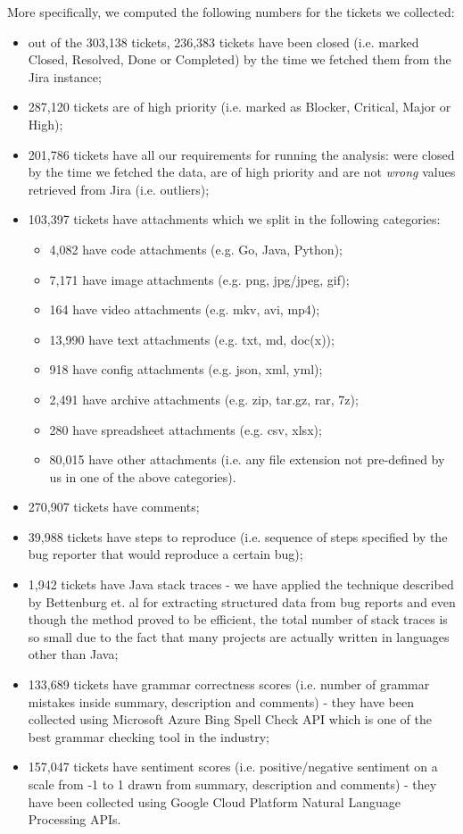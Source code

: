 \documentclass{mpaper}
\begin{document}
More specifically, we computed the following numbers for the tickets we collected:
\begin{itemize}
  \item out of the 303,138 tickets, 236,383 tickets have been closed (i.e. marked Closed, Resolved, Done or Completed) by the time we 
  fetched them from the Jira instance;
  \item 287,120 tickets are of high priority (i.e. marked as Blocker, Critical, Major or High);
  \item 201,786 tickets have all our requirements for running the analysis: were closed by the time we fetched the data, 
  are of high priority and are not \emph{wrong} values retrieved from Jira (i.e. outliers);
  \item 103,397 tickets have attachments which we split in the following categories:
    \begin{itemize}
      \item 4,082 have code attachments (e.g. Go, Java, Python);
      \item 7,171 have image attachments (e.g. png, jpg/jpeg, gif);
      \item 164 have video attachments (e.g. mkv, avi, mp4);
      \item 13,990 have text attachments (e.g. txt, md, doc(x));
      \item 918 have config attachments (e.g. json, xml, yml);
      \item 2,491 have archive attachments (e.g. zip, tar.gz, rar, 7z);
      \item 280 have spreadsheet attachments (e.g. csv, xlsx);
      \item 80,015 have other attachments (i.e. any file extension not pre-defined by us in one of the above categories).
    \end{itemize}
  \item 270,907 tickets have comments;
  \item 39,988 tickets have steps to reproduce (i.e. sequence of steps specified by the bug reporter that would reproduce a certain bug); 
  \item 1,942 tickets have Java stack traces - we have applied the technique described by Bettenburg et. al 
  \cite{bettenburg2008extracting} for extracting structured data from bug reports and even though the method proved to be efficient, 
  the total number of stack traces is so small due to the fact that many projects are actually written in languages other than Java;
  \item 133,689 tickets have grammar correctness scores (i.e. number of grammar mistakes inside summary, description and comments) - 
  they have been collected using Microsoft Azure Bing Spell Check API which is one of the best grammar checking tool in the industry; 
  \item 157,047 tickets have sentiment scores (i.e. positive/negative sentiment on a scale from -1 to 1 drawn from summary, description
  and comments) - they have been collected using Google Cloud Platform Natural Language Processing APIs.
\end{itemize}
\end{document}
